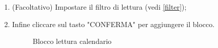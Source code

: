 \begin{enumerate}
\begin{enumerate}
	\end{enumerate}
	\item (Facoltativo) Impostare il filtro di lettura (vedi \ref{filter});
	\item Infine cliccare sul tasto "CONFERMA" per aggiungere il blocco.
	\begin{figure}[!ht]
		\centering
		\caption{Blocco lettura calendario}
	\end{figure}
\end{enumerate}
\newpage
